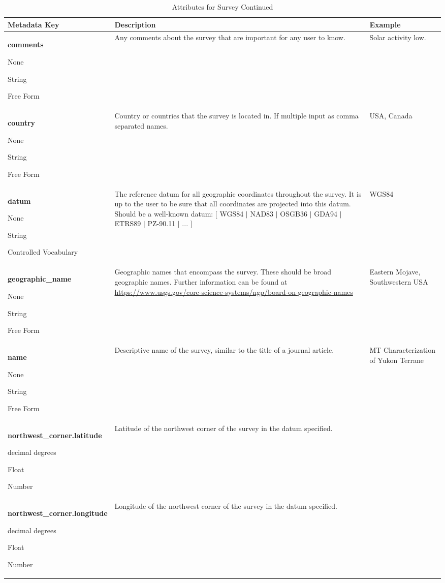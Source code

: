 \documentclass[12pt]{article}
\newcommand{\True}[0]{{\color{Red}{\textbf{True}}}}
\newcommand{\False}[0]{{\color{Teal}{\textbf{False}}}}
\newcommand{\entry}[7]{
	\textbf{#1} 
	\begin{itemize}[topsep=5pt,itemsep=-.1pt,parsep=-2pt,partopsep=0pt,labelwidth=2em,align=left,itemindent=1em]
		\begin{small}
			\item[Required:] #2
			\item[Units:] #3
			\item[Type:] #4
			\item[Style:] #5
		\end{small}
	\end{itemize} & #6 & #7 \\ \midrule}
\begin{document}
\begin{table}[h!]
	\caption*{Attributes for Survey  Continued}
	\begin{tabular}{p{}>{\raggedright}p{}>{\raggedright\arraybackslash}p{}}
		\textbf{Metadata Key} & \textbf{Description} & \textbf{Example} \\ \toprule
		\entry{comments}{\False}{None}{String}{Free Form}{Any comments about the survey that are important for any user to know.}{Solar activity low.}	
		\entry{country}{\True}{None}{String}{Free Form}{Country or countries that the survey is located in. If multiple input as comma separated names.}{USA, Canada}
		\entry{datum}{\True}{None}{String}{Controlled Vocabulary}{The reference datum for all geographic coordinates throughout the survey. It is up to the user to be sure that all coordinates are projected into this datum.  Should be a well-known datum: [ WGS84 $|$ NAD83 $|$ OSGB36 $|$ GDA94 $|$ ETRS89 $|$ PZ-90.11 $|$ ... ]}{WGS84}
		\entry{geographic\_name}{\True}{None}{String}{Free Form}{Geographic names that encompass the survey.  These should be broad geographic names.  Further information can be found at \url{https://www.usgs.gov/core-science-systems/ngp/board-on-geographic-names}}{Eastern Mojave, Southwestern USA}
		\entry{name}{\True}{None}{String}{Free Form}{Descriptive name of the survey, similar to the title of a journal article.}{MT Characterization of Yukon Terrane}
		\entry{northwest\_corner.latitude}{\True}{decimal degrees}{Float}{Number}{Latitude of the northwest corner of the survey in the datum specified.}{23.134}
		\entry{northwest\_corner.longitude}{\True}{decimal degrees}{Float}{Number}{Longitude of the northwest corner of the survey in the datum specified.}{14.23}
	
	\end{tabular}
	\label{tab:survey2}
\end{table} 

\clearpage
\newpage
\end{document}
